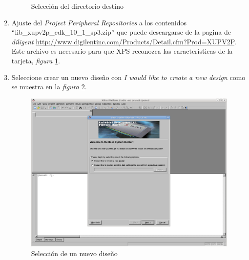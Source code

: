 \begin{enumerate}
\begin{figure}[h!]
  \caption{Selección del directorio destino}
  \label{Selección del directorio destino}
  \end{figure}
 \item Ajuste del \emph{Project Peripheral Repositories} a los contenidos\\
``lib\_xupv2p\_edk\_10\_1\_sp3.zip'' que puede descargarse de la pagina de
 \emph{diligent}
 \url{http://www.digilentinc.com/Products/Detail.cfm?Prod=XUPV2P}. 
  Este archivo es necesario para que XPS reconozca las características de la
tarjeta, \emph{figura} \ref{Selección del directorio destino}.
 \item Seleccione crear un nuevo diseño con \emph{I would like to create a new
design} como se muestra en la \emph{figura} \ref{Selección de un nuevo diseño}.
  \begin{figure}[h!] 
  \centering
  \includegraphics[scale=.25]{./figuras/EDK2.png}
  \caption{Selección de un nuevo diseño}
  \label{Selección de un nuevo diseño}
  \end{figure}
 

\end{enumerate}
